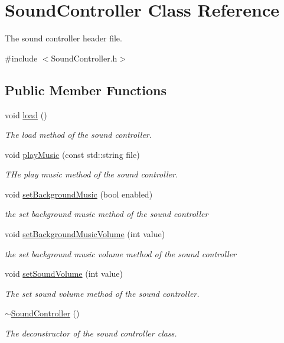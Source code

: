 \hypertarget{class_sound_controller}{\section{Sound\+Controller Class Reference}
\label{class_sound_controller}
}


The sound controller header file.  




{\ttfamily \#include $<$Sound\+Controller.\+h$>$}

\subsection*{Public Member Functions}
\begin{DoxyCompactItemize}
\item 
void \hyperlink{class_sound_controller_a6fe6f4192a2664969c9b71616060e440}{load} ()
\begin{DoxyCompactList}\small\item\em The load method of the sound controller. \end{DoxyCompactList}\item 
void \hyperlink{class_sound_controller_aa13c7b3735163a1f4c259c9d357ec510}{play\+Music} (const std\+::string file)
\begin{DoxyCompactList}\small\item\em T\+He play music method of the sound controller. \end{DoxyCompactList}\item 
void \hyperlink{class_sound_controller_ad9640d15b2e9b32829d051b59ae5de9d}{set\+Background\+Music} (bool enabled)
\begin{DoxyCompactList}\small\item\em the set background music method of the sound controller \end{DoxyCompactList}\item 
void \hyperlink{class_sound_controller_a7df7bc23543a4567aae652b064b19c73}{set\+Background\+Music\+Volume} (int value)
\begin{DoxyCompactList}\small\item\em the set background music volume method of the sound controller \end{DoxyCompactList}\item 
void \hyperlink{class_sound_controller_ac2553758c376ca9e2b38f0f1a071bba7}{set\+Sound\+Volume} (int value)
\begin{DoxyCompactList}\small\item\em The set sound volume method of the sound controller. \end{DoxyCompactList}\item 
\hyperlink{class_sound_controller_ac1d1f3fedeb2463d763254cbb314ba92}{$\sim$\+Sound\+Controller} ()
\begin{DoxyCompactList}\small\item\em The deconstructor of the sound controller class. \end{DoxyCompactList}\end{DoxyCompactItemize}
